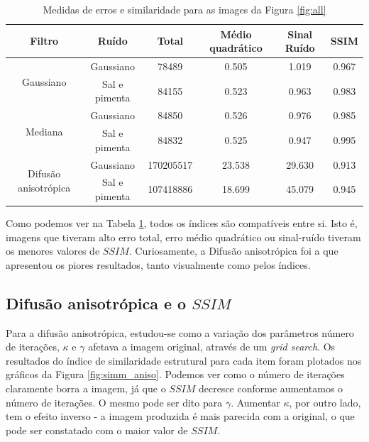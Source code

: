 \documentclass[10pt,a4paper]{article}
\begin{document}
\begin{table}[!ht]
\begin{tabular}{cccccc}
\toprule
Filtro & Ruído & Total & Médio quadrático & Sinal Ruído & SSIM \\ \midrule
\multirow{2}{*}{Gaussiano}              & Gaussiano         & 78489 & 0.505 & 1.019 & 0.967 \\
                                        & Sal e pimenta     & 84155 & 0.523 & 0.963 & 0.983 \\\midrule
\multirow{2}{*}{Mediana}                & Gaussiano         & 84850 & 0.526 & 0.976 & 0.985 \\
                                        & Sal e pimenta    & 84832 & 0.525 & 0.947 & 0.995 \\\midrule
\multirow{2}{*}{Difusão anisotrópica}   & Gaussiano     & 170205517 & 23.538 & 29.630 & 0.913 \\
                                        & Sal e pimenta & 107418886 & 18.699 & 45.079 & 0.945 \\\bottomrule
\end{tabular}
\caption{Medidas de erros e similaridade para as images da Figura \ref{fig:all}}
\label{tab:results}
\end{table}

Como podemos ver na Tabela \ref{tab:results}, todos os índices são compatíveis entre si. Isto é, imagens que tiveram alto erro total, erro médio quadrático ou sinal-ruído tiveram os menores valores de $\mathit{SSIM}$. Curiosamente, a Difusão anisotrópica foi a que apresentou os piores resultados, tanto visualmente como pelos índices.

\subsection{Difusão anisotrópica e o $\mathit{SSIM}$}
Para a difusão anisotrópica, estudou-se como a variação dos parâmetros número de iterações, $\kappa$ e $\gamma$ afetava a imagem original, através de um \textit{grid search}. Os resultados do índice de similaridade estrutural para cada item foram plotados nos gráficos da Figura \ref{fig:simm_aniso}. Podemos ver como o número de iterações claramente borra a imagem, já que o $\mathit{SSIM}$ decresce conforme aumentamos o número de iterações. O mesmo pode ser dito para $\gamma$. Aumentar $\kappa$, por outro lado, tem o efeito inverso - a imagem produzida é mais parecida com a original, o que pode ser constatado com o maior valor de $\mathit{SSIM}$.
\end{document}
